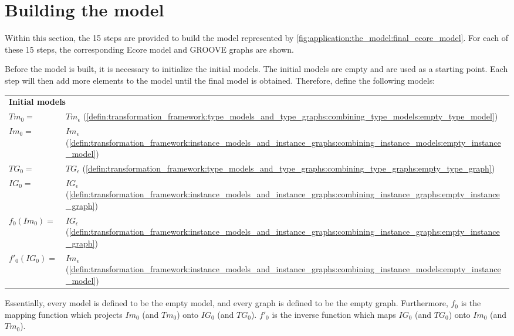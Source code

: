 \section{Building the model}
\label{sec:application:building_the_model}

Within this section, the 15 steps are provided to build the model represented by \cref{fig:application:the_model:final_ecore_model}. For each of these 15 steps, the corresponding Ecore model and GROOVE graphs are shown.

Before the model is built, it is necessary to initialize the initial models. The initial models are empty and are used as a starting point. Each step will then add more elements to the model until the final model is obtained. Therefore, define the following models:

\begin{tabularx}{\textwidth}{|lX|}
\hline
\multicolumn{2}{|l|}{\textbf{Initial models}}\\
\hhline{|==|}
$Tm_0 = $ & $Tm_\epsilon$ (\cref{defin:transformation_framework:type_models_and_type_graphs:combining_type_models:empty_type_model}) \\
$Im_0 = $ & $Im_\epsilon$ (\cref{defin:transformation_framework:instance_models_and_instance_graphs:combining_instance_models:empty_instance_model})\\
\hline
$TG_0 = $ & $TG_\epsilon$ (\cref{defin:transformation_framework:type_models_and_type_graphs:combining_type_graphs:empty_type_graph})\\
$IG_0 = $ & $IG_\epsilon$ (\cref{defin:transformation_framework:instance_models_and_instance_graphs:combining_instance_graphs:empty_instance_graph})\\
\hline
$f_0(Im_0) = $ & $IG_\epsilon$ (\cref{defin:transformation_framework:instance_models_and_instance_graphs:combining_instance_graphs:empty_instance_graph})\\
$f'_0(IG_0) = $ & $Im_\epsilon$ (\cref{defin:transformation_framework:instance_models_and_instance_graphs:combining_instance_models:empty_instance_model})\\
\hline
\end{tabularx}

Essentially, every model is defined to be the empty model, and every graph is defined to be the empty graph. Furthermore, $f_0$ is the mapping function which projects $Im_0$ (and $Tm_0$) onto $IG_0$ (and $TG_0$). $f'_0$ is the inverse function which maps $IG_0$ (and $TG_0$) onto $Im_0$ (and $Tm_0$).


